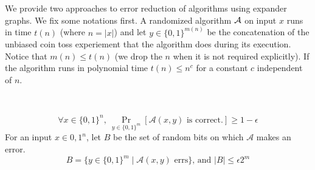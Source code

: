
We provide two approaches to error reduction of algorithms using expander graphs. We fix some notations first. A randomized algorithm ${\cal{A}}$ on input $x$ runs in time $t(n)$ (where $n=|x|$) and let $y \in \{0,1\}^{m(n)}$ be the concatenation of the unbiased coin toss experiement that the algorithm does during its execution. Notice that $m(n) \le t(n)$ (we drop the $n$ when it is not required explicitly). If the algorithm runs in polynomial time $t(n) \le n^c$ for a constant $c$ independent of $n$. \\

\begin{minipage}{0.4\linewidth}
\end{minipage}
\begin{minipage}{0.05\linewidth}
~
\end{minipage}
\begin{minipage}{0.5\linewidth}
\vspace{-5mm}
$$\forall x \in \{0,1\}^n,~\Pr_{y \in \{0,1\}^m} [\mathcal{A}(x,y) \textrm{ is correct.}] \ge 1-\epsilon $$
For an input $x \in {0,1}^n$, let $B$ be the set of random bits on which $\mathcal{A}$ makes an error.
$$B = \{ y \in \{0,1\}^m \mid \mathcal{A}(x,y) \textrm{ errs}\} \textrm{, and $|B| \le \epsilon2^m$}$$
\end{minipage}
\vspace{3mm}

